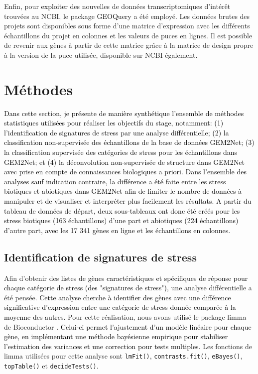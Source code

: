 \documentclass[twoside]{article}
\newcommand{\AR}[1]{\textcolor{black}{#1}}
\begin{document}
    \vspace{0.5cm}Enfin, pour \AR{exploiter} des nouvelles de données \AR{transcriptomiques} d'intérêt trouvées au NCBI, le package \AR{GEOQuery} \cite{davis_geoquery_2007} a été employé. Les données brutes des projets sont disponibles sous forme d'une matrice d'expression avec les différents échantillons du projet en colonnes et les valeurs de puces en lignes. Il est possible de revenir aux gènes à partir de cette matrice grâce à la matrice de design propre à la version de la puce utilisée, disponible sur NCBI également.
    
\section{\textbf{M\'ethodes}}

\AR{Dans cette section, je présente de manière synthétique l'ensemble de méthodes statistiques utilisées pour réaliser les objectifs du stage, notamment: (1) l'identification de signatures de stress par une analyse différentielle; (2) la classification non-supervisée des échantillons de la base de données GEM2Net; (3) la classification supervisée des catégories de stress pour les échantillons dans GEM2Net; et (4) la déconvolution non-supervisée de structure dans GEM2Net avec prise en compte de connaissances biologiques a priori. Dans l'ensemble des analyses sauf indication contraire, la différence a été faite entre les stress biotiques et abiotiques dans GEM2Net afin de limiter le nombre de données à manipuler et de visualiser et interpréter plus facilement les résultats. A partir du tableau de données de départ, deux sous-tableaux ont donc été créés pour les stress biotiques (163 échantillons) d'une part et abiotiques (224 échantillons) d'autre part, avec les 17 341 gènes en ligne et les échantillons en colonnes.}

    \subsection{Identification de signatures de stress}
    
Afin d'obtenir des \AR{listes de gènes caractéristiques et spécifiques de réponse pour chaque catégorie de stress (des "signatures de stress")}, une analyse différentielle a été pensée. \AR{Cette analyse cherche à identifier des gènes avec une différence significative d'expression entre une catégorie de stress donnée comparée à la moyenne des autres}. Pour cette réalisation, nous avons utilisé le package limma de Bioconductor \cite{ritchie_limma_2015}. \AR{Celui-ci permet l'ajustement d'un modèle linéaire pour chaque gène, en implémentant une méthode bayésienne empirique pour stabiliser l'estimation des variances et une correction pour tests multiples.} 
    Les fonctions de limma utilisées pour cette analyse sont \texttt{lmFit()}, \texttt{contrasts.fit()}, \texttt{eBayes()}, \texttt{topTable()} et \texttt{decideTests()}.
    
\end{document}
